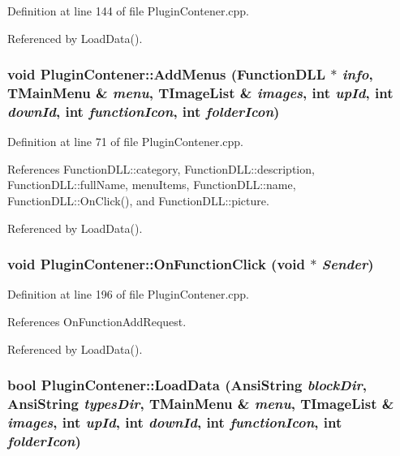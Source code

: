 Definition at line 144 of file PluginContener.cpp.

Referenced by LoadData().\hypertarget{classPluginContener_715587c2fae1c1bc6d3b6ea6d601b2bb}{
\subsubsection[AddMenus]{\setlength{\rightskip}{0pt plus 5cm}void PluginContener::AddMenus ({\bf FunctionDLL} $\ast$ {\em info}, \/  TMainMenu \& {\em menu}, \/  TImageList \& {\em images}, \/  int {\em upId}, \/  int {\em downId}, \/  int {\em functionIcon}, \/  int {\em folderIcon})}}
\label{classPluginContener_715587c2fae1c1bc6d3b6ea6d601b2bb}




Definition at line 71 of file PluginContener.cpp.

References FunctionDLL::category, FunctionDLL::description, FunctionDLL::fullName, menuItems, FunctionDLL::name, FunctionDLL::OnClick(), and FunctionDLL::picture.

Referenced by LoadData().\hypertarget{classPluginContener_cd1a48f16b62158ba9fef9b9796eafdf}{
\subsubsection[OnFunctionClick]{\setlength{\rightskip}{0pt plus 5cm}void PluginContener::OnFunctionClick (void $\ast$ {\em Sender})}}
\label{classPluginContener_cd1a48f16b62158ba9fef9b9796eafdf}




Definition at line 196 of file PluginContener.cpp.

References OnFunctionAddRequest.

Referenced by LoadData().\hypertarget{classPluginContener_21655d404d32e8a2f2c8918d2751ea16}{
\subsubsection[LoadData]{\setlength{\rightskip}{0pt plus 5cm}bool PluginContener::LoadData (AnsiString {\em blockDir}, \/  AnsiString {\em typesDir}, \/  TMainMenu \& {\em menu}, \/  TImageList \& {\em images}, \/  int {\em upId}, \/  int {\em downId}, \/  int {\em functionIcon}, \/  int {\em folderIcon})}}
\label{classPluginContener_21655d404d32e8a2f2c8918d2751ea16}


